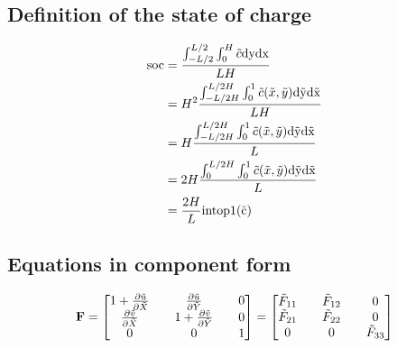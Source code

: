 \documentclass[../main.tex]{subfiles}
\begin{document}
\subsection{Definition of the state of charge}

\begin{align}
    \rm{soc} &= \frac{\int_{-L/2}^{L/2} \int_0^H \tilde{c} \rm{d}y \rm{d}x}{L H} \\
         &= H^2\frac{\int_{-L/2H}^{L/2H} \int_0^1 \tilde{c}(\tilde{x}, \tilde{y}) \rm{d}\tilde{y} \rm{d}\tilde{x}}{L H} \\
         &= H\frac{\int_{-L/2H}^{L/2H} \int_0^1 \tilde{c}(\tilde{x}, \tilde{y}) \rm{d}\tilde{y} \rm{d}\tilde{x}}{L} \\
         &= 2 H\frac{\int_0^{L/2H} \int_0^1 \tilde{c}(\tilde{x}, \tilde{y}) \rm{d}\tilde{y} \rm{d}\tilde{x}}{L} \\
         &= \frac{2 H }{L} \rm{intop1}(\tilde{c})
\end{align}

\subsection{Equations in component form}
\begin{align}
\mathbf{F} = 
\begin{bmatrix}
       1 + \frac{\partial \tilde{u}}{\partial \tilde{X}} && \frac{\partial \tilde{u}}{\partial \tilde{Y}} && 0 \\
       \frac{\partial \tilde{v}}{\partial \tilde{X}} && 1 + \frac{\partial \tilde{v}}{\partial \tilde{Y}} && 0 \\
       0 && 0 && 1
\end{bmatrix} = \begin{bmatrix}
    \tilde{F}_{11} && \tilde{F}_{12}  && 0 \\
    \tilde{F}_{21} && \tilde{F}_{22}  && 0 \\
    0 && 0 && \tilde{F}_{33}
\end{bmatrix}
\end{align}


\end{document}
